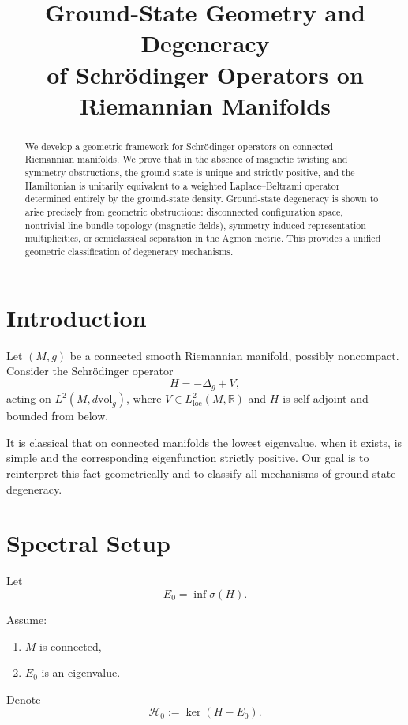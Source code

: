 \documentclass[11pt]{article}
\title{Ground-State Geometry and Degeneracy\\
of Schrödinger Operators on Riemannian Manifolds}
\author{}
\date{}
\begin{document}
\maketitle

\begin{abstract}
We develop a geometric framework for Schrödinger operators on connected Riemannian manifolds. 
We prove that in the absence of magnetic twisting and symmetry obstructions, the ground state 
is unique and strictly positive, and the Hamiltonian is unitarily equivalent to a weighted 
Laplace--Beltrami operator determined entirely by the ground-state density. 
Ground-state degeneracy is shown to arise precisely from geometric obstructions: disconnected 
configuration space, nontrivial line bundle topology (magnetic fields), symmetry-induced 
representation multiplicities, or semiclassical separation in the Agmon metric. 
This provides a unified geometric classification of degeneracy mechanisms.
\end{abstract}

\tableofcontents

\section{Introduction}

Let $(M,g)$ be a connected smooth Riemannian manifold, possibly noncompact. 
Consider the Schrödinger operator
\[
H = -\Delta_g + V,
\]
acting on $L^2(M,d\mathrm{vol}_g)$, where $V \in L^2_{\mathrm{loc}}(M,\mathbb{R})$ 
and $H$ is self-adjoint and bounded from below.

It is classical that on connected manifolds the lowest eigenvalue, when it exists, 
is simple and the corresponding eigenfunction strictly positive. 
Our goal is to reinterpret this fact geometrically and to classify all mechanisms 
of ground-state degeneracy.

\section{Spectral Setup}

Let
\[
E_0 = \inf \sigma(H).
\]

Assume:
\begin{enumerate}[label=(\alph*)]
\item $M$ is connected,
\item $E_0$ is an eigenvalue.
\end{enumerate}

Denote
\[
\mathcal H_0 := \ker(H - E_0).
\]
\end{document}
